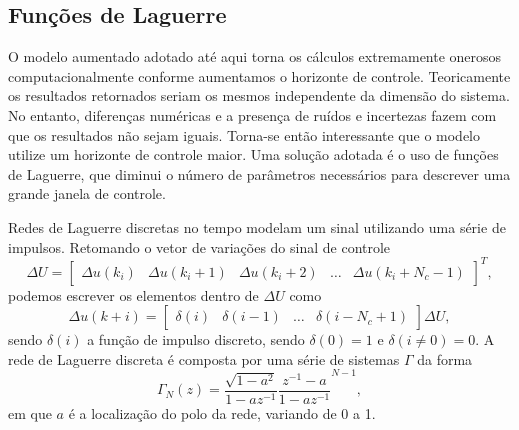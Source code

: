 \subsection{Funções de Laguerre}%
\label{subsec:mpc-laguerre}

O modelo aumentado adotado até aqui torna os cálculos extremamente onerosos
computacionalmente conforme aumentamos o horizonte de controle. Teoricamente os
resultados retornados seriam os mesmos independente da dimensão do sistema. No
entanto, diferenças numéricas e a presença de ruídos e incertezas fazem com que
os resultados não sejam iguais. Torna-se então interessante que o modelo utilize
um horizonte de controle maior. Uma solução adotada é o uso de funções de
Laguerre, que diminui o número de parâmetros necessários para descrever uma
grande janela de controle.

Redes de Laguerre discretas no tempo modelam um sinal utilizando uma série de
impulsos. Retomando o vetor de variações do sinal de controle
%
\begin{equation}
	\Delta{}U = \begin{bmatrix}
		\Delta{}u(k_i)     &
		\Delta{}u(k_i + 1) &
		\Delta{}u(k_i + 2) &
		\hdots{}           &
		\Delta{}u(k_i + N_c - 1)
	\end{bmatrix}^T,
\end{equation}
%
podemos escrever os elementos dentro de \(\Delta{}U\) como
%
\begin{equation}
	\Delta{}u(k+i) = \begin{bmatrix}
		\delta{}(i)           &
		\delta{}(i-1)         &
		\hdots{}              &
		\delta{}(i - N_c + 1)
	\end{bmatrix}\Delta{}U,
\end{equation}
%
sendo \(\delta{}(i)\) a função de impulso discreto, sendo \(\delta{}(0) = 1\) e
\(\delta{}(i\neq{}0) = 0\). A rede de Laguerre discreta é composta por uma série
de sistemas \(\Gamma{}\) da forma
%
\begin{equation}
	\label{eq:laguerre-system-z}
	\Gamma{}_N(z) = \frac{\sqrt{1-a^2}}{1-az^{-1}}\frac{z^{-1}-a}{1-az^{-1}}^{N-1},
\end{equation}
%
em que \(a\) é a localização do polo da rede, variando de 0 a 1.

